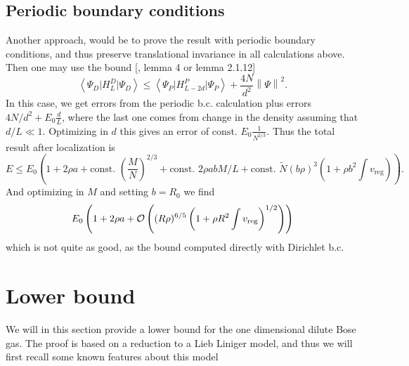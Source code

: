 \documentclass[a4paper,11pt]{article}
\newcommand{\norm}[1]{\left\lVert #1 \right\rVert}
\renewcommand{\braket}[1]{\left\langle#1\right\rangle}
\numberwithin{equation}{section}
\begin{document}
	\subsection{Periodic boundary conditions}
	Another approach, would be to prove the result with periodic boundary conditions, and thus preserve translational invariance in all calculations above. Then one may use the bound [\cite{2020JMP....61f1901M}, lemma 4 or \cite{robinson2014thermodynamic} lemma 2.1.12] \begin{equation}
	\braket{\Psi_D\lvert H^D_L \rvert \Psi_D}\leq \braket{\Psi_P\lvert H^P_{L-2d}\rvert \Psi_P}+\frac{4N}{d^2}\norm{\Psi}^2.
	\end{equation}
	In this case, we get errors from the periodic b.c. calculation plus errors $ 4N/d^2+E_0\frac{d}{L} $, where the last one comes from change in the density assuming that $ d/L\ll 1 $. Optimizing in $ d $ this gives an error of $ \text{const. }E_0 \frac{1}{N^{2/3}} $. Thus the total result after localization is \begin{equation}
	E\leq E_0\left(1+2\rho a+\text{const. }\left(\frac{M}{N}\right)^{2/3}+\text{const. }2\rho abM/L+\text{const. }\tilde{N}(b\rho)^3\left(1+\rho b^2\int v_{\text{reg}}\right)\right).
	\end{equation}
	And optimizing in $ M $ and setting $ b=R_0 $ we find\begin{equation}
	E_0\left(1+2\rho a + \mathcal{O}\left((R\rho)^{6/5}\left(1+\rho R^2 \int v_{\textnormal{reg}}\right)^{1/2}\right)\right)
	\end{equation}
	which is not quite as good, as the bound computed directly with Dirichlet b.c.

	\section{Lower bound}
	We will in this section provide a lower bound for the one dimensional dilute Bose gas. The proof is based on a reduction to a Lieb Liniger model, and thus we will first recall some known features about this model
\end{document}
